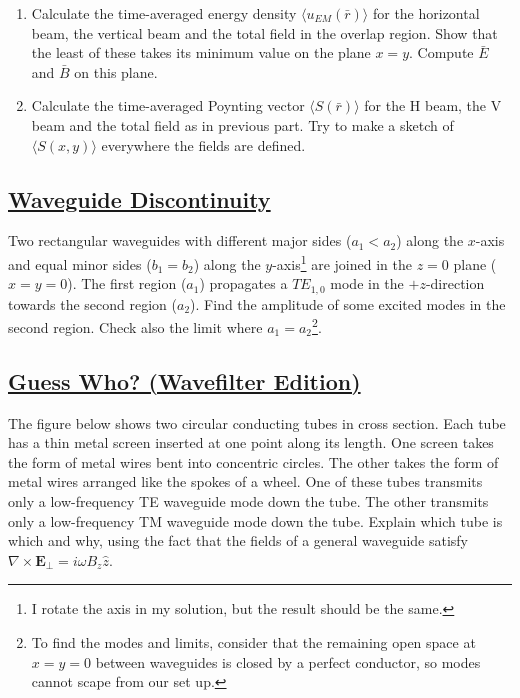 \begin{enumerate}
	\item Calculate the time-averaged energy density $\langle u_{EM}(\bar{r})\rangle$ for the horizontal beam, the vertical beam and the total field in the overlap region. Show that the least of these takes its minimum value on the plane $x = y$. Compute $\bar{E}$ and $\bar{B}$ on this plane.
	\item Calculate the time-averaged Poynting vector $\langle S(\bar{r})\rangle$ for the H beam, the V beam and the total field as in previous part. Try to make a sketch of $\langle S(x,y)\rangle$ everywhere the fields are defined.
\end{enumerate}

\subsection{\hyperref[Waveguide Discontinuity]{Waveguide Discontinuity}}

Two rectangular waveguides with different major sides ($a_{1} < a_{2}$) along the $x$-axis and equal minor sides ($b_{1}= b_{2}$) along the $y$-axis\footnote{I rotate the axis in my solution, but the result should be the same.} are joined in the $z=0$ plane ($x=y=0$). The first region ($a_{1}$) propagates a $TE_{1,0}$ mode in the $+z$-direction towards the second region ($a_{2}$). Find the amplitude of some excited modes in the second region. Check also the limit where $a_{1} = a_{2}$\footnote{To find the modes and limits, consider that the remaining open space at $x=y=0$ between waveguides is closed by a perfect conductor, so modes cannot scape from our set up.}.

\subsection{\hyperref[Guess Who? (Wavefilter Edition)]{Guess Who? (Wavefilter Edition)}}

The figure below shows two circular conducting tubes in cross section. Each tube has a thin metal screen inserted at one point along its length. One screen takes the form of metal wires bent into concentric circles. The other takes the form of metal wires arranged like the spokes of a wheel. One of these tubes transmits only a low-frequency TE waveguide mode down the tube. The other transmits only a low-frequency TM waveguide mode down the tube. Explain which tube is which and why, using the fact that the fields of a general waveguide satisfy $\nabla \times \mathbf{E}_{\perp}=i \omega B_{z} \hat{z}$.

